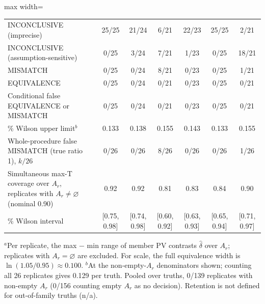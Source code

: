 \begin{table}[ht]
\begin{adjustbox}{max width=\textwidth}
\begin{tabular}{@{}>{\raggedright\arraybackslash}p{5.6cm}cccccc@{}}
\quad INCONCLUSIVE (imprecise) & 25/25 & 21/24 & 6/21 & 22/23 & 25/25 & 2/21 \\
\quad INCONCLUSIVE (assumption-sensitive) & 0/25 & 3/24 & 7/21 & 1/23 & 0/25 & 18/21 \\
\quad MISMATCH & 0/25 & 0/24 & 8/21 & 0/23 & 0/25 & 1/21 \\
\quad EQUIVALENCE & 0/25 & 0/24 & 0/21 & 0/23 & 0/25 & 0/21 \\
Conditional false EQUIVALENCE or MISMATCH & 0/25 & 0/24 & 0/21 & 0/23 & 0/25 & 0/21 \\
\quad 95\% Wilson upper limit$^{b}$ & 0.133 & 0.138 & 0.155 & 0.143 & 0.133 & 0.155 \\
Whole-procedure false MISMATCH (true ratio 1), $k/26$ & 0/26 & 0/26 & 8/26 & 0/26 & 0/26 & 1/26 \\
\addlinespace
Simultaneous max-T coverage over $A_r$, replicates with $A_r \ne \varnothing$ (nominal 0.90) & 0.92 & 0.92 & 0.81 & 0.83 & 0.84 & 0.90 \\
\quad 95\% Wilson interval & [0.75, 0.98] & [0.74, 0.98] & [0.60, 0.92] & [0.63, 0.93] & [0.65, 0.94] & [0.71, 0.97] \\
\bottomrule
\end{tabular}
\end{adjustbox}

\smallskip
\raggedright\footnotesize
$^{a}$Per replicate, the max $-$ min range of member PV contrasts $\hat\delta$ over $A_r$; replicates with $A_r = \varnothing$ are excluded. For scale, the full equivalence width is $\ln(1.05/0.95) \approx 0.100$. $^{b}$At the non-empty-$A_r$ denominators shown; counting all 26 replicates gives 0.129 per truth. Pooled over truths, 0/139 replicates with non-empty $A_r$ (0/156 counting empty $A_r$ as no decision). Retention is not defined for out-of-family truths (n/a).
\end{table}
